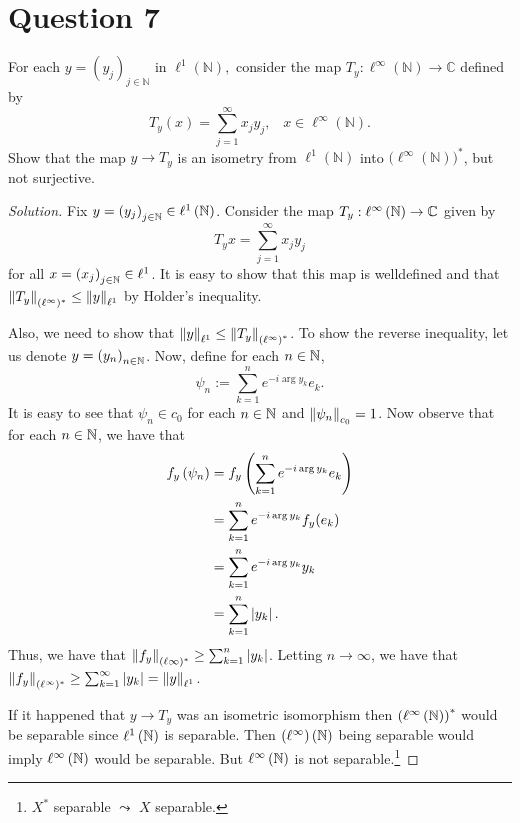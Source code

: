 \section{Question 7}
\horz
For each $y=(y_j)_{j\in\mathbb N}$ in $\ell^1(\mathbb N),$  consider the map $T_y : \ell^{\infty}(\mathbb N) \to \mathbb C$ defined by $$T_y(x) = \sum\limits_{j=1}^{\infty}x_jy_j,\,\,\,\, \,x\in \ell^{\infty}(\mathbb N).$$ Show that the map $y \to T_y$ is an isometry from $\ell^1(\mathbb N)$ into  $\big(\ell^{\infty}(\mathbb N)\big)^*$, but not surjective.
\horz

\begin{proof}[Solution]
    Fix $y = \left( y_{j} \right)_{j\in \mathbb N} \in \ell ^{1} \left( \mathbb N \right)$. Consider the map $T_{y} : \ell ^{\infty} \left( \mathbb N \right) \to \mathbb C$ given by
    \begin{equation*}
	T_{y} x =\sum_{j=1}^{\infty} x_{j}y_{j}
    \end{equation*}
    for all $x=\left( x_{j} \right)_{j \in \mathbb N}  \in \ell ^{1}$. It is easy to show that this map is welldefined and that $\left\lVert T_{y} \right\rVert_{(\ell ^{\infty})^{*}} \le \left\lVert y \right\rVert_{\ell ^{1}}$ by Holder's inequality.

    Also, we need to show that $\left\lVert y \right\rVert_{\ell ^{1}} \le \left\lVert T_{y} \right\rVert_{\left( \ell ^{\infty} \right)^{*}}$.      To show the reverse inequality, let us denote $y = \left( y_{n} \right)_{n\in \mathbb N}$. Now, define for each $n \in \mathbb N$,
     \begin{equation*}
	 \psi _{n} := \sum_{k=1}^{n} e^{-i \arg y_{k}} e_{k}.
     \end{equation*}
     It is easy to see that $\psi _{n}  \in c_{0}$ for each $n\in \mathbb N$ and $\left\lVert \psi_{n} \right\rVert_{c_{0}}=1$. Now observe that for each $n\in \mathbb N$, we have that
     \begin{align*}
	 f_{y} \left( \psi_{n} \right) &= f_{y} \left(  \sum_{k=1}^{n} e^{-i \arg y_{k}} e_{k} \right) \\
	 &= \sum_{k=1}^{n} e^{-i \arg y_{k}} f_{y}(e_{k})  \\
	 &= \sum_{k=1}^{n} e^{-i \arg y_{k}} y_{k} \\
	 &= \sum_{k=1}^{n} \left\lvert y_{k} \right\rvert.
     \end{align*}
     Thus, we have that $\left\lVert f_{y} \right\rVert_{(\ell \infty)^{*}} \ge \sum_{k=1}^{n} \left\lvert y_{k} \right\rvert$. Letting $n\to \infty$, we have that $\left\lVert f_{y} \right\rVert_{(\ell ^\infty)^{*}} \ge \sum_{k=1}^{\infty} \left\lvert y_{k} \right\rvert = \left\lVert y \right\rVert_{\ell ^{1}}$.
    
     If it happened that $y \to T_{y}$ was an isometric isomorphism then $\left( \ell ^{\infty} \left( \mathbb N \right) \right)^{*}$ would be separable since $\ell ^{1} \left( \mathbb N \right)$ is separable. Then $\left( \ell ^{\infty} \right) \left( \mathbb N \right)$ being separable would imply $\ell ^{\infty} \left( \mathbb N \right)$ would be separable. But $\ell ^{\infty} \left( \mathbb N \right)$ is not separable.\footnote{$X^{*}$ separable $\leadsto $ $X$ separable.}
     

\end{proof}
